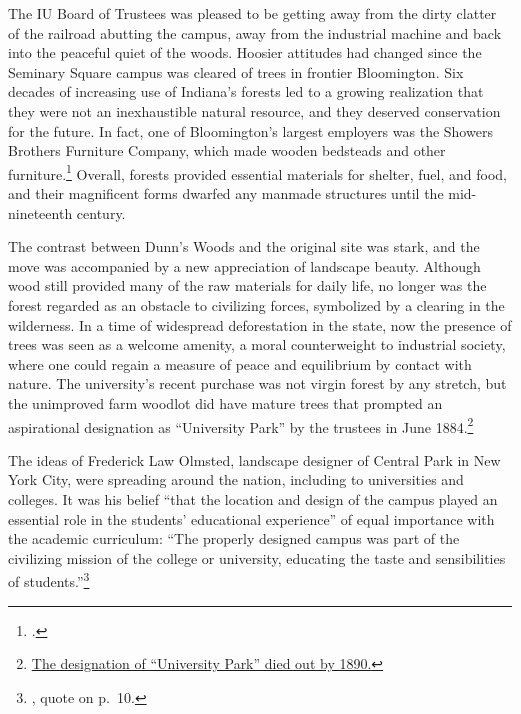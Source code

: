 \documentclass[
  american,
  letterpaper,
]{scrreprt}
\begin{document}
The IU Board of Trustees was pleased to be getting away from the dirty
clatter of the railroad abutting the campus, away from the industrial
machine and back into the peaceful quiet of the woods. Hoosier attitudes
had changed since the Seminary Square campus was cleared of trees in
frontier Bloomington. Six decades of increasing use of Indiana's forests
led to a growing realization that they were not an inexhaustible natural
resource, and they deserved conservation for the future. In fact, one of
Bloomington's largest employers was the Showers Brothers Furniture
Company, which made wooden bedsteads and other furniture.\footnote{.} Overall, forests provided essential
materials for shelter, fuel, and food, and their magnificent forms
dwarfed any manmade structures until the mid-nineteenth century.

The contrast between Dunn's Woods and the original site was stark, and
the move was accompanied by a new appreciation of landscape beauty.
Although wood still provided many of the raw materials for daily life,
no longer was the forest regarded as an obstacle to civilizing forces,
symbolized by a clearing in the wilderness. In a time of widespread
deforestation in the state, now the presence of trees was seen as a
welcome amenity, a moral counterweight to industrial society, where one
could regain a measure of peace and equilibrium by contact with nature.
The university's recent purchase was not virgin forest by any stretch,
but the unimproved farm woodlot did have mature trees that prompted an
aspirational designation as ``University Park'' by the trustees in June
1884.\footnote{\href{https://purl.dlib.indiana.edu/iudl/archives/iubot/1884-06-04}{The
  designation of ``University Park'' died out by 1890.}}

The ideas of Frederick Law Olmsted, landscape designer of Central Park
in New York City, were spreading around the nation, including to
universities and colleges. It was his belief ``that the location and
design of the campus played an essential role in the students'
educational experience'' of equal importance with the academic
curriculum: ``The properly designed campus was part of the civilizing
mission of the college or university, educating the taste and
sensibilities of students.''\footnote{, quote on p.~10.}
\end{document}
